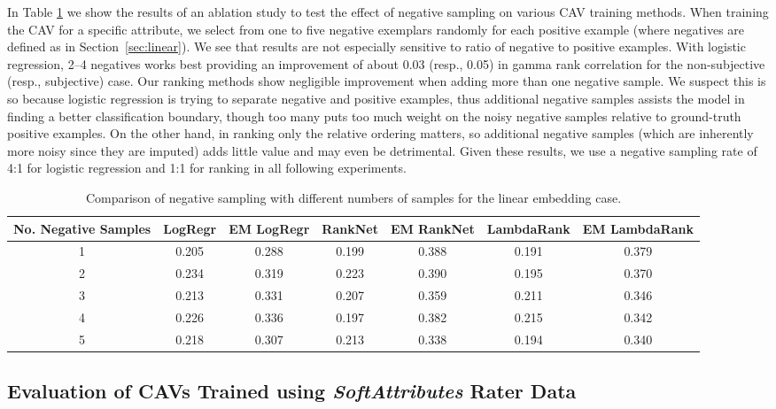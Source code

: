 \documentclass[manuscript,screen,nonacm]{acmart}
\newcommand{\1}{{\mathbf 1}}
\theoremstyle{TheoremNum}
\begin{document}
In Table \ref{tab:negative_sampling_comparison} we show the results of an ablation study to test the effect of negative sampling on various CAV training methods. When training the CAV for a specific attribute, we select from one to five negative exemplars randomly for each positive example (where negatives are defined as in Section~\ref{sec:linear}).  We see that results are not especially sensitive to ratio of negative to positive examples. With logistic regression, 2--4 negatives works best providing an improvement of about 0.03 (resp., 0.05) in gamma rank correlation for the non-subjective (resp., subjective) case. Our ranking methods show negligible improvement when adding more than one negative sample. We suspect this is so because logistic regression is trying to separate negative and positive examples, thus additional negative samples assists the model in finding a better classification boundary, though too many puts too much weight on the noisy negative samples relative to ground-truth positive examples. On the other hand, in ranking only the relative ordering matters, so additional negative samples (which are inherently more noisy since they are imputed) adds little value and may even be detrimental. Given these results, we use a negative sampling rate of 4:1 for logistic regression and 1:1 for ranking in all following experiments. 


\begin{table}
\begin{tabular}{|c||c|c|c|c|c|c|}
\hline
No. Negative Samples & LogRegr & EM LogRegr & RankNet & EM RankNet & LambdaRank & EM LambdaRank \\ \hline
1 & 0.205 & 0.288 & 0.199 & 0.388 & 0.191 & 0.379 \\ 
2 & 0.234 & 0.319 & 0.223 & 0.390 & 0.195 & 0.370 \\
3 & 0.213 & 0.331 & 0.207 & 0.359 & 0.211 & 0.346 \\
4 & 0.226 & 0.336 & 0.197 & 0.382 & 0.215 & 0.342 \\
5 & 0.218 & 0.307 & 0.213 & 0.338 & 0.194 & 0.340 \\ \hline 
\end{tabular}
\vspace*{2mm}
    \caption{Comparison of negative sampling with different numbers of samples for the linear embedding case.}
    \label{tab:negative_sampling_comparison}
\end{table}

\subsection{Evaluation of CAVs Trained using \emph{SoftAttributes} Rater Data}
\label{sec:ratereval_SA}
\end{document}
